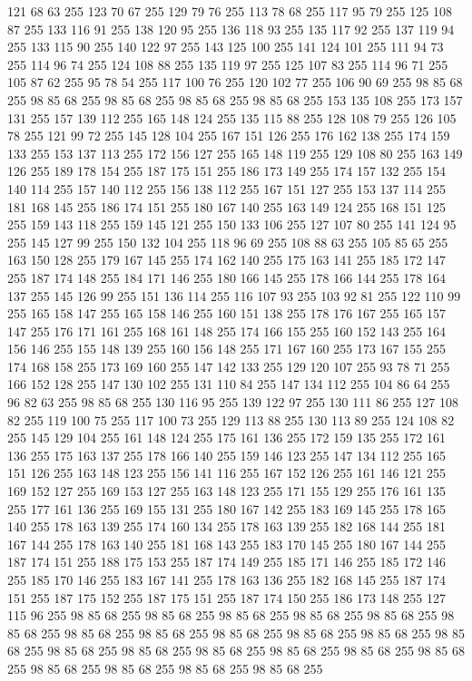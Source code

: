 121 68 63 255 123 70 67 255 129 79 76 255 113 78 68 255 117 95 79 255 125 108 87 255 133 116 91 255 138 120 95 255 136 118 93 255 135 117 92 255 137 119 94 255 133 115 90 255 140 122 97 255 143 125 100 255 141 124 101 255 111 94 73 255 114 96 74 255 124 108 88 255 135 119 97 255 125 107 83 255 114 96 71 255 105 87 62 255 95 78 54 255 117 100 76 255 120 102 77 255 106 90 69 255 98 85 68 255 98 85 68 255 98 85 68 255 98 85 68 255 98 85 68 255 153 135 108 255 173 157 131 255 157 139 112 255 165 148 124 255 135 115 88 255 128 108 79 255 126 105 78 255 121 99 72 255 145 128 104 255 167 151 126 255 176 162 138 255 174 159 133 255 153 137 113 255 172 156 127 255 165 148 119 255 129 108 80 255 163 149 126 255 189 178 154 255 187 175 151 255 186 173 149 255 174 157 132 255 154 140 114 255 157 140 112 255 156 138 112 255 167 151 127 255 153 137 114 255 181 168 145 255 186 174 151 255 180 167 140 255 163 149 124 255 168 151 125 255 159 143 118 255 159 145 121 255
150 133 106 255 127 107 80 255 141 124 95 255 145 127 99 255 150 132 104 255 118 96 69 255 108 88 63 255 105 85 65 255 163 150 128 255 179 167 145 255 174 162 140 255 175 163 141 255 185 172 147 255 187 174 148 255 184 171 146 255 180 166 145 255 178 166 144 255 178 164 137 255 145 126 99 255 151 136 114 255 116 107 93 255 103 92 81 255 122 110 99 255 165 158 147 255 165 158 146 255 160 151 138 255 178 176 167 255 165 157 147 255 176 171 161 255 168 161 148 255 174 166 155 255 160 152 143 255 164 156 146 255 155 148 139 255 160 156 148 255 171 167 160 255 173 167 155 255 174 168 158 255 173 169 160 255 147 142 133 255 129 120 107 255 93 78 71 255 166 152 128 255 147 130 102 255 131 110 84 255 147 134 112 255 104 86 64 255 96 82 63 255 98 85 68 255 130 116 95 255 139 122 97 255 130 111 86 255 127 108 82 255 119 100 75 255 117 100 73 255 129 113 88 255 130 113 89 255 124 108 82 255 145 129 104 255 161 148 124 255 175 161 136 255 172 159 135 255 172 161 136 255 175 163 137 255
178 166 140 255 159 146 123 255 147 134 112 255 165 151 126 255 163 148 123 255 156 141 116 255 167 152 126 255 161 146 121 255 169 152 127 255 169 153 127 255 163 148 123 255 171 155 129 255 176 161 135 255 177 161 136 255 169 155 131 255 180 167 142 255 183 169 145 255 178 165 140 255 178 163 139 255 174 160 134 255 178 163 139 255 182 168 144 255 181 167 144 255 178 163 140 255 181 168 143 255 183 170 145 255 180 167 144 255 187 174 151 255 188 175 153 255 187 174 149 255 185 171 146 255 185 172 146 255 185 170 146 255 183 167 141 255 178 163 136 255 182 168 145 255 187 174 151 255 187 175 152 255 187 175 151 255 187 174 150 255 186 173 148 255 127 115 96 255 98 85 68 255 98 85 68 255 98 85 68 255 98 85 68 255 98 85 68 255 98 85 68 255 98 85 68 255 98 85 68 255 98 85 68 255 98 85 68 255 98 85 68 255 98 85 68 255 98 85 68 255 98 85 68 255 98 85 68 255 98 85 68 255 98 85 68 255 98 85 68 255 98 85 68 255 98 85 68 255 98 85 68 255 98 85 68 255

